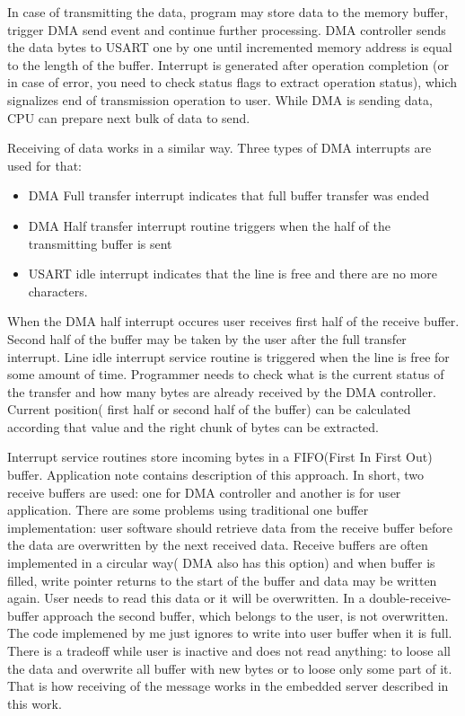 In case of transmitting the data, program may store data to the memory
buffer, trigger DMA send event and continue further processing. DMA controller
sends the data bytes to USART one by one until incremented memory address is
equal to the length of the buffer. Interrupt is generated after operation
completion (or in case of error, you need to check status flags to extract
operation status), which signalizes end of transmission operation to user.
While DMA is sending data, CPU can prepare next bulk of data to send.

Receiving of data works in a similar way.
Three types of DMA interrupts are used for that:
\begin{itemize}
  \item DMA Full transfer interrupt indicates that full buffer transfer was
  ended
  \item DMA Half transfer interrupt routine triggers when the half of the
  transmitting buffer is sent
  \item USART idle interrupt indicates that the
  line is free and there are no more characters.
\end{itemize}  
When the DMA half interrupt occures user receives first half of the receive
buffer. Second half of the buffer may be taken by the user after the full
transfer interrupt. Line idle interrupt service routine is triggered when the
line is free for some amount of time. Programmer needs to check what is the
current status of the transfer and how many bytes are already received by the
DMA controller. Current position( first half or second half of the buffer) can
be calculated according that value and the right chunk of bytes can be
extracted.

Interrupt service routines store incoming bytes in a FIFO(First In First Out)
buffer. Application note \cite{stm_dma_fifo_appnote} contains description of
this approach. In short, two receive buffers are used: one for DMA controller
and another is for user application. There are some problems using traditional
one buffer implementation: user software should retrieve data from the
receive buffer before the data are overwritten by the next received data.
Receive buffers are often implemented in a circular way( DMA also has this
option) and when buffer is filled, write pointer returns to the start of the
buffer and data may be written again. User needs to read this data or it will be
overwritten. In a double-receive-buffer approach the second buffer, which
belongs to the user, is not overwritten. The code implemened by me just ignores
to write into user buffer when it is full. There is a tradeoff while user is
inactive and does not read anything: 
to loose all the data and overwrite all buffer with new bytes or to loose only
some part of it. That is how receiving of the message works in the embedded
server described in this work.

